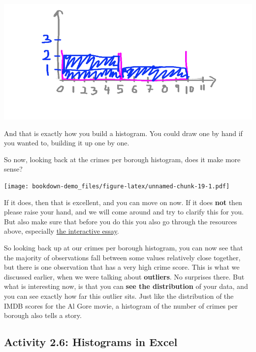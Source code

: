 \documentclass[
]{book}
\begin{document}
\includegraphics{imgs/hist_fill_3.png}

And that is exactly how you build a histogram. You could draw one by hand if you wanted to, building it up one by one.

So now, looking back at the crimes per borough histogram, does it make more sense?

\texttt{[image: bookdown-demo\_files/figure-latex/unnamed-chunk-19-1.pdf]}

If it does, then that is excellent, and you can move on now. If it does \textbf{not} then please raise your hand, and we will come around and try to clarify this for you. But also make sure that before you do this you also go through the resources above, especially \href{http://tinlizzie.org/histograms/}{the interactive essay}.

So looking back up at our crimes per borough histogram, you can now see that the majority of observations fall between some values relatively close together, but there is one observation that has a very high crime score. This is what we discussed earlier, when we were talking about \textbf{outliers}. No surprises there. But what is interesting now, is that you can \textbf{see the distribution} of your data, and you can see exactly how far this outlier sits. Just like the distribution of the IMDB scores for the Al Gore movie, a histogram of the number of crimes per borough also tells a story.

\hypertarget{activity-2.6-histograms-in-excel}{%
\subsection{Activity 2.6: Histograms in Excel}\label{activity-2.6-histograms-in-excel}}
\end{document}
